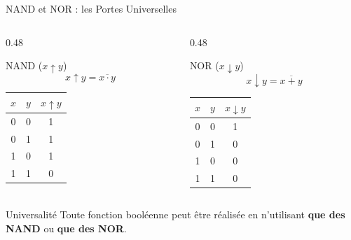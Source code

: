 \begin{frame}{NAND et NOR : les Portes Universelles}

    \begin{columns}[T]
        \begin{column}{0.48\textwidth}
            \begin{block}{NAND (\(x \uparrow y\))}
                \[
                    x \uparrow y = \overline{x \cdot y}
                \]
                \centering
                \begin{tabular}{|c|c|c|}
                    \hline
                    \(x\) & \(y\) & \(x \uparrow y\) \\
                    \hline
                    0 & 0 & 1 \\
                    0 & 1 & 1 \\
                    1 & 0 & 1 \\
                    1 & 1 & 0 \\
                    \hline
                \end{tabular}
            \end{block}
        \end{column}

        \begin{column}{0.48\textwidth}
            \begin{block}{NOR (\(x \downarrow y\))}
                \[
                    x \downarrow y = \overline{x + y}
                \]
                \centering
                \begin{tabular}{|c|c|c|}
                    \hline
                    \(x\) & \(y\) & \(x \downarrow y\) \\
                    \hline
                    0 & 0 & 1 \\
                    0 & 1 & 0 \\
                    1 & 0 & 0 \\
                    1 & 1 & 0 \\
                    \hline
                \end{tabular}
            \end{block}
        \end{column}
    \end{columns}

    \vspace{0.4cm}

    \begin{alertblock}{Universalité}
        Toute fonction booléenne peut être réalisée en n'utilisant \textbf{que des NAND} ou \textbf{que des NOR}.
    \end{alertblock}

\end{frame}
